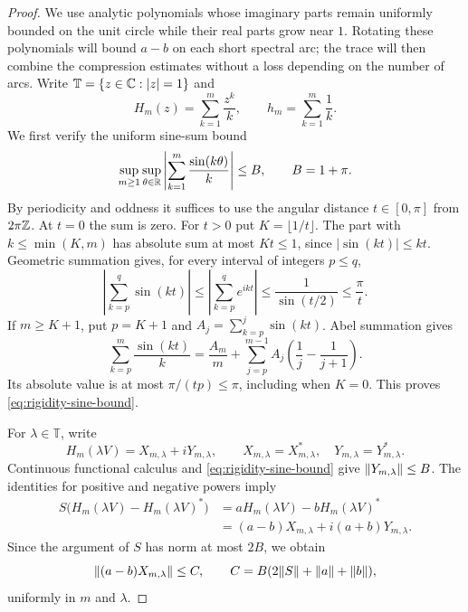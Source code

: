 \begin{proof}
We use analytic polynomials whose imaginary parts remain uniformly
bounded on the unit circle while their real parts grow near $1$.
Rotating these polynomials
will bound $a-b$ on each short spectral arc; the trace will then combine
the compression estimates without a loss depending on the number of arcs.
Write $\mathbb T=\{z\in\mathbb C:|z|=1\}$ and
\[
 H_m(z)=\sum_{k=1}^m\frac{z^k}{k},\qquad
 h_m=\sum_{k=1}^m\frac1k.
\]
We first verify the uniform sine-sum bound
\begin{equation}\label{eq:rigidity-sine-bound}
 \sup_{m\geq1}\sup_{\theta\in\mathbb R}
 \left|\sum_{k=1}^m\frac{\sin(k\theta)}k\right|
 \leq B,\qquad B=1+\pi.
\end{equation}
By periodicity and oddness it suffices to use the angular distance
$t\in[0,\pi]$ from $2\pi\mathbb Z$.  At $t=0$ the sum is zero.  For $t>0$
put $K=\lfloor1/t\rfloor$.  The part with $k\leq\min(K,m)$ has
absolute sum at most $Kt\leq1$, since $|\sin(kt)|\leq kt$.
Geometric summation gives, for every interval of integers $p\leq q$,
\[
 \left|\sum_{k=p}^q\sin(kt)\right|
 \leq\left|\sum_{k=p}^q e^{ikt}\right|
 \leq\frac1{\sin(t/2)}\leq\frac\pi t.
\]
If $m\geq K+1$, put $p=K+1$ and
$A_j=\sum_{k=p}^j\sin(kt)$.  Abel summation gives
\[
 \sum_{k=p}^m\frac{\sin(kt)}k
 =\frac{A_m}{m}
   +\sum_{j=p}^{m-1}A_j\left(\frac1j-\frac1{j+1}\right).
\]
Its absolute value is at most $\pi/(tp)\leq\pi$, including when
$K=0$.  This proves \eqref{eq:rigidity-sine-bound}.

For $\lambda\in\mathbb T$, write
\[
 H_m(\lambda V)=X_{m,\lambda}+iY_{m,\lambda},
 \qquad X_{m,\lambda}=X_{m,\lambda}^*,\quad
 Y_{m,\lambda}=Y_{m,\lambda}^*.
\]
Continuous functional calculus and \eqref{eq:rigidity-sine-bound}
give $\lVert Y_{m,\lambda}\rVert\leq B$.  The identities for positive and
negative powers imply
\[
 \begin{split}
 S\bigl(H_m(\lambda V)-H_m(\lambda V)^*\bigr)
 &=aH_m(\lambda V)-bH_m(\lambda V)^*\\
 &=(a-b)X_{m,\lambda}+i(a+b)Y_{m,\lambda}.
 \end{split}
\]
Since the argument of $S$ has norm at most $2B$, we obtain
\begin{equation}\label{eq:rigidity-real-bound}
 \lVert(a-b)X_{m,\lambda}\rVert\leq C,
 \qquad C=B(2\lVert S\rVert+\lVert a\rVert+\lVert b\rVert),
\end{equation}
uniformly in $m$ and $\lambda$.


\end{proof}
